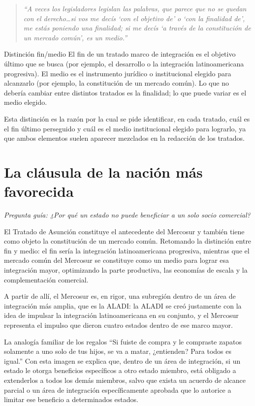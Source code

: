\documentclass[12pt,oneside]{book}
\newenvironment{citadocente}
  {\begin{quote}\itshape\RaggedRight}
  {\end{quote}}
\begin{document}
\begin{citadocente}
``A veces los legisladores legislan las palabras, que parece que no se quedan con el derecho\ldots si vos me decís `con el objetivo de' o `con la finalidad de', me estás poniendo una finalidad; si me decís `a través de la constitución de un mercado común', es un medio.''
\end{citadocente}

\begin{definition}{Distinción fin/medio}
El fin de un tratado marco de integración es el objetivo último que se busca (por ejemplo, el desarrollo o la integración latinoamericana progresiva). El medio es el instrumento jurídico o institucional elegido para alcanzarlo (por ejemplo, la constitución de un mercado común). Lo que no debería cambiar entre distintos tratados es la finalidad; lo que puede variar es el medio elegido.
\end{definition}

Esta distinción es la razón por la cual se pide identificar, en cada tratado, cuál es el fin último perseguido y cuál es el medio institucional elegido para lograrlo, ya que ambos elementos suelen aparecer mezclados en la redacción de los tratados.

\section{La cláusula de la nación más favorecida}

\textit{Pregunta guía: ¿Por qué un estado no puede beneficiar a un solo socio comercial?}

El Tratado de Asunción constituye el antecedente del Mercosur y también tiene como objeto la constitución de un mercado común. Retomando la distinción entre fin y medio: el fin sería la integración latinoamericana progresiva, mientras que el mercado común del Mercosur se constituye como un medio para lograr esa integración mayor, optimizando la parte productiva, las economías de escala y la complementación comercial.

A partir de allí, el Mercosur es, en rigor, una subregión dentro de un área de integración más amplia, que es la ALADI: la ALADI se creó justamente con la idea de impulsar la integración latinoamericana en su conjunto, y el Mercosur representa el impulso que dieron cuatro estados dentro de ese marco mayor.

\begin{example}{La analogía familiar de los regalos}
``Si fuiste de compra y le compraste zapatos solamente a uno solo de tus hijos, se va a matar, ¿entienden? Para todos es igual.'' Con esta imagen se explica que, dentro de un área de integración, si un estado le otorga beneficios específicos a otro estado miembro, está obligado a extenderlos a todos los demás miembros, salvo que exista un acuerdo de alcance parcial o un área de integración específicamente aprobada que lo autorice a limitar ese beneficio a determinados estados.
\end{example}
\end{document}
